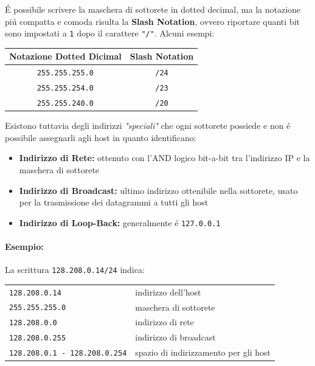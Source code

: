 \documentclass[12pt]{article}
\def\code#1{\texttt{#1}}
\begin{document}
\'E possibile scrivere la maschera di sottorete in dotted decimal, ma la notazione pi\'u compatta e comoda risulta la 
\textbf{Slash Notation}, ovvero riportare quanti bit sono impostati a \code{1} dopo il carattere \code{"/"}. Alcuni 
esempi:
\begin{center}
	\begin{tabular}{ |c|c| }
		\hline
		\textbf{Notazione Dotted Dicimal} & \textbf{Slash Notation}\\
 		\hline
 		\code{255.255.255.0} & \code{/24} \\ 
 		\code{255.255.254.0} & \code{/23} \\ 
 		\code{255.255.240.0} & \code{/20} \\  
 		\hline
	\end{tabular}
\end{center}
Esistono tuttavia degli indirizzi \textit{"speciali"} che ogni sottorete possiede e non \'e possibile assegnarli agli 
host in quanto identificano:
\begin{itemize}[noitemsep]
	\item \textbf{Indirizzo di Rete:} ottenuto con l'AND logico bit-a-bit tra l'indirizzo IP e la maschera di sottorete
	\item \textbf{Indirizzo di Broadcast:} ultimo indirizzo ottenibile nella sottorete, usato per la trasmissione dei 
	      datagrammi a tutti gli host
	\item \textbf{Indirizzo di Loop-Back:} generalmente \'e \code{127.0.0.1}
\end{itemize}

\paragraph{Esempio:} La scrittura \code{128.208.0.14/24} indica:\\
\begin{center}
	\begin{tabular}{l|l}
		\code{128.208.0.14}    & indirizzo dell'host    \\
		\code{255.255.255.0}   & maschera di sottorete  \\
		\code{128.208.0.0}     & indirizzo di rete      \\
		\code{128.208.0.255}   & indirizzo di broadcast \\
		\code{128.208.0.1 - 128.208.0.254} & spazio di indirizzamento per gli host \\ 
	\end{tabular}
\end{center}
\end{document}
